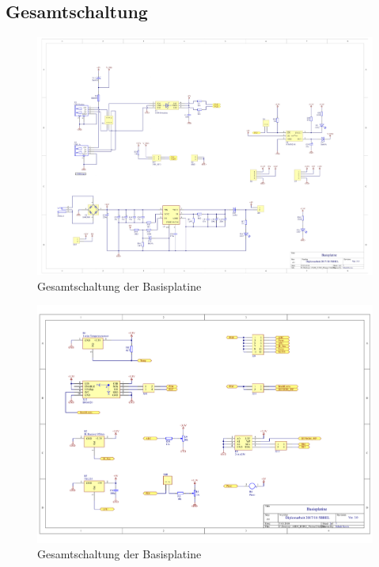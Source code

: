 \subsection{Gesamtschaltung}
\label{sec:basisplatine-schaltung}
\begin{figure}[H]
    \centering
    \includegraphics[width=1.25\textwidth,angle=90]{Schuh/Pictures/Basis2-Schaltung1}
    \caption[Gesamtschaltung der Basisplatine]{Gesamtschaltung der \gls{Basisplatine}}
    \label{fig:basisplatine-schaltung}
\end{figure}
\begin{figure}[H]\ContinuedFloat
    \centering
    \includegraphics[width=1.25\textwidth,angle=90]{Schuh/Pictures/Basis2-Schaltung2}
    \caption[Gesamtschaltung der Basisplatine]{Gesamtschaltung der \gls{Basisplatine}}
\end{figure}
